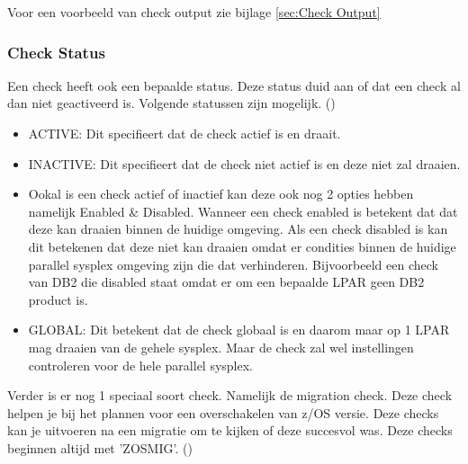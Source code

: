 Voor een voorbeeld van check output zie bijlage \ref{sec:Check Output}

\subsubsection{Check Status}
\label{subsubsec:Check Status}

Een check heeft ook een bepaalde status. Deze status duid aan of dat een check al dan niet geactiveerd is. Volgende statussen zijn mogelijk. (\cite{IBM2019})

\begin{itemize}
	\item ACTIVE: Dit specifieert dat de check actief is en draait.
	\item INACTIVE: Dit specifieert dat de check niet actief is en deze niet zal draaien.
	\item Ookal is een check actief of inactief kan deze ook nog 2 opties hebben namelijk Enabled \& Disabled. Wanneer een check enabled is betekent dat dat deze kan draaien binnen de huidige omgeving. Als een check disabled is kan dit betekenen dat deze niet kan draaien omdat er condities binnen de huidige parallel sysplex omgeving zijn die dat verhinderen. Bijvoorbeeld een check van DB2 die disabled staat omdat er om een bepaalde LPAR geen DB2 product is.
	\item GLOBAL: Dit betekent dat de check globaal is en daarom maar op 1 LPAR mag draaien van de gehele sysplex. Maar de check zal wel instellingen controleren voor de hele parallel sysplex. 
\end{itemize}


Verder is er nog 1 speciaal soort check. Namelijk de migration check. Deze check helpen je bij het plannen voor een overschakelen van z/OS versie. Deze checks kan je uitvoeren na een migratie om te kijken of deze succesvol was. Deze checks beginnen altijd met 'ZOSMIG'. (\cite{IBMCorporation2019})
